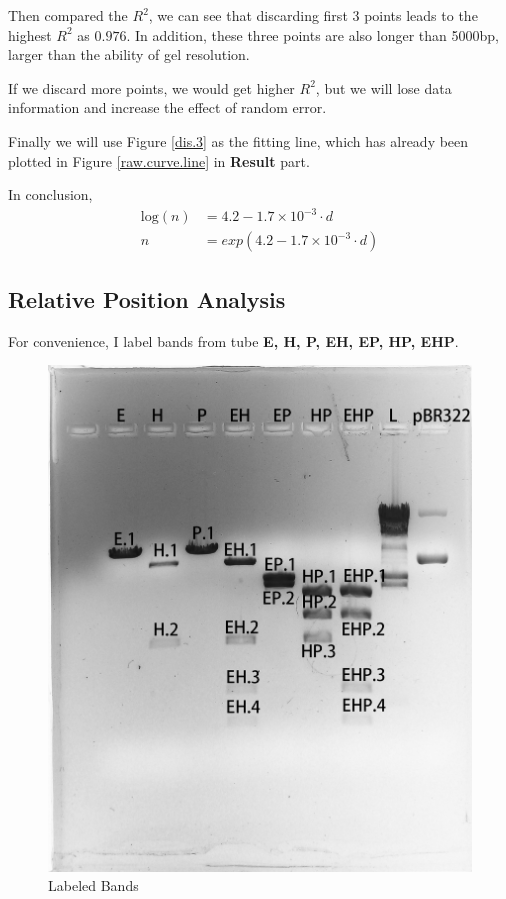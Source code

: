 \documentclass{article}
\begin{document}
            Then compared the $R^2$, we can see that discarding first 3 points leads to the highest $R^2$ as $0.976$. In addition, these three points are also longer than 5000bp, larger than the ability of gel resolution. 

            If we discard more points, we would get higher $R^2$, but we will lose data information and increase the effect of random error.

            Finally we will use Figure \ref{dis.3} as the fitting line, which has already been plotted in Figure \ref{raw.curve.line} in \textbf{Result} part.

            In conclusion,
            $$
            \begin{aligned}
                \text{log}(n) &= 4.2 - 1.7\times 10 ^ {-3} \cdot d\\
                n &= exp(4.2 - 1.7 \times 10 ^ {-3} \cdot d)
            \end{aligned}
            $$

        \subsection{Relative Position Analysis}
            For convenience, I label bands from tube \textbf{E, H, P, EH, EP, HP, EHP}.
            \begin{figure}[H]
                \centering
                \includegraphics[width = 0.5\linewidth]{../Data/xun_and_sam_label.png}
                \caption{Labeled Bands}
                \label{label.bands}
            \end{figure}
\end{document}
